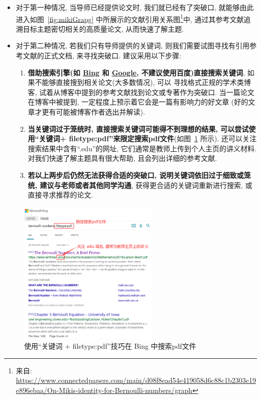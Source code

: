 \documentclass{formatBook}
\begin{document}
\begin{itemize}
    \item 对于第一种情况, 当导师已经提供论文时, 我们就已经有了突破口, 就能够由此进入如图~\ref{fig:mikiGrapg} 中所展示的文献引用关系图\footnote{来自: \url{https://www.connectedpapers.com/main/d08f8ead54e419058d6c88c1b2303e19e896ebaa/On-Mikis-identity-for-Bernoulli-numbers/graph}}中, 通过其参考文献追溯目标主题密切相关的高质量论文, 从而快速了解主题.
    \item 对于第二种情况, 若我们只有导师提供的关键词, 则我们需要试图寻找有引用参考文献的正式文档, 来寻找突破口. 建议采用以下步骤:
          \begin{enumerate}
              \item \textbf{借助搜索引擎(如 \href{https://www.bing.com/}{Bing} 和 \href{https://www.google.com/}{Google}, 不建议使用百度)直接搜索关键词}, 如果不能够直接搜到相关论文(大多数情况), 可以 寻找格式正规的学术类博客, 试着从博客中提到的参考文献找到论文或专著作为突破口. 当一篇论文在博客中被提到, 一定程度上预示着它会是一篇有影响力的好文章 (好的文章才更有可能被博客作者选出并解读).
              \item \textbf{当关键词过于笼统时, 直接搜索关键词可能得不到理想的结果, 可以尝试使用``关键词+ filetype:pdf''来限定搜索pdf文件}(如图~\ref{fig:bing} 所示). 还可以关注搜索结果中含有``.edu''的网址, 它们通常是教师上传到个人主页的讲义材料. 对我们快速了解主题具有很大帮助, 且会列出详细的参考文献.
              \item \textbf{若以上两步后仍然无法获得合适的突破口, 说明关键词依旧过于细致或笼统, 建议与老师或者其他同学沟通}, 获得更合适的关键词重新进行搜索, 或直接寻求推荐的论文.
          \end{enumerate}
\end{itemize}

\begin{figure}[H]
    \centering
    \includegraphics[width=0.6\textwidth]{figure/bingSearch.png}
    \caption{使用``关键词 + filetype:pdf''技巧在 Bing 中搜索pdf文件}
    \label{fig:bing}
\end{figure}
\end{document}
